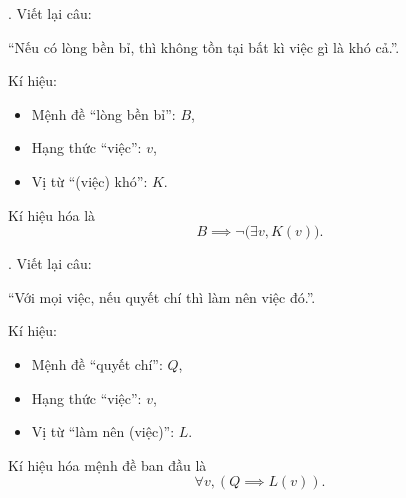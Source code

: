 . Viết lại câu:
\begin{center}
   ``Nếu có lòng bền bỉ, thì không tồn tại bất kì việc gì là khó cả.''.
\end{center}
Kí hiệu:
\begin{itemize}
   \item Mệnh đề ``lòng bền bỉ'': $B$,
   \item Hạng thức ``việc'': $v$,
   \item Vị từ ``(việc) khó'': $K$.
\end{itemize}
Kí hiệu hóa là
\begin{equation*}
   B \implies \neg \big(\exists v, K(v)\big).
\end{equation*}

. Viết lại câu:
\begin{center}
   ``Với mọi việc, nếu quyết chí thì làm nên việc đó.''.
\end{center}
Kí hiệu:
\begin{itemize}
   \item Mệnh đề ``quyết chí'': $Q$,
   \item Hạng thức ``việc'': $v$,
   \item Vị từ ``làm nên (việc)'': $L$.
\end{itemize}
Kí hiệu hóa mệnh đề ban đầu là
\begin{equation*}
   \forall v, (Q \implies L(v)).
\end{equation*}